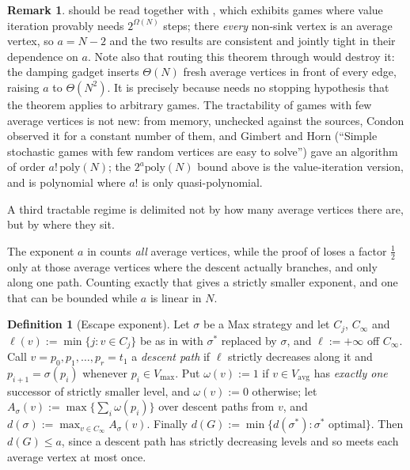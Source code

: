 \documentclass[11pt]{article}
\theoremstyle{plain}
\theoremstyle{definition}
\newtheorem{definition}[theorem]{Definition}
\newtheorem{remark}[theorem]{Remark}
\newcommand{\Vmax}{V_{\max}}
\newcommand{\Vavg}{V_{\mathrm{avg}}}
\begin{document}
\begin{remark}
 should be read together with ,
which exhibits games where value iteration provably needs
$2^{\Omega(N)}$ steps; there \emph{every} non-sink vertex is an average
vertex, so $a=N-2$ and the two results are consistent and jointly tight
in their dependence on $a$. Note also that routing this theorem through
 would destroy it: the damping gadget
inserts $\Theta(N)$ fresh average vertices in front of every edge, raising
$a$ to $\Theta(N^{2})$. It is precisely because  needs no
stopping hypothesis that the theorem applies to arbitrary games. The
tractability of games with few average vertices is not new: from memory,
unchecked against the sources, Condon observed it for a constant number
of them, and Gimbert and Horn (``Simple stochastic games with few random
vertices are easy to solve'') gave an algorithm of order
$a!\,\mathrm{poly}(N)$; the $2^{a}\mathrm{poly}(N)$ bound above is the
value-iteration version, and is polynomial where $a!$ is only
quasi-polynomial.
\end{remark}

A third tractable regime is delimited not by how many average vertices
there are, but by where they sit.

The exponent $a$ in  counts \emph{all} average vertices,
while the proof of  loses a factor $\tfrac12$ only at
those average vertices where the descent actually branches, and only along
one path. Counting exactly that gives a strictly smaller exponent, and one
that can be bounded while $a$ is linear in $N$.

\begin{definition}[Escape exponent]\label{def:escape}
Let $\sigma$ be a Max strategy and let $C_j$, $C_\infty$ and
$\ell(v):=\min\{j:v\in C_j\}$ be as in  with
$\sigma^\ast$ replaced by $\sigma$, and $\ell:=+\infty$ off $C_\infty$. Call $v=p_0,p_1,\dots,p_r=t_1$ a
\emph{descent path} if $\ell$ strictly decreases along it and
$p_{i+1}=\sigma(p_i)$ whenever $p_i\in\Vmax$. Put $\omega(v):=1$ if
$v\in\Vavg$ has \emph{exactly one} successor of strictly smaller level,
and $\omega(v):=0$ otherwise; let
$A_\sigma(v):=\max\bigl\{\sum_{i}\omega(p_i)\bigr\}$ over descent paths
from $v$, and $d(\sigma):=\max_{v\in C_\infty}A_\sigma(v)$. Finally
$d(G):=\min\{d(\sigma^\ast):\sigma^\ast\text{ optimal}\}$. Then
$d(G)\le a$, since a descent path has strictly decreasing levels and so
meets each average vertex at most once.
\end{definition}
\end{document}
